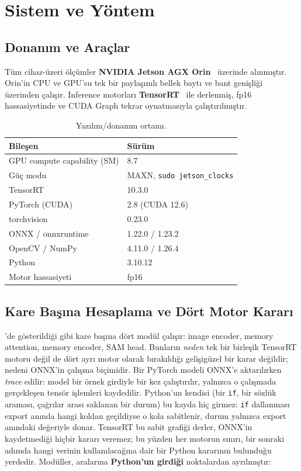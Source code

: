 \chapter{Sistem ve Yöntem}
\label{ch:sistem-yontem}

\section{Donanım ve Araçlar}

Tüm cihaz-üzeri ölçümler \textbf{NVIDIA Jetson AGX Orin}~\cite{nvidia2024orin}
üzerinde alınmıştır. Orin'in CPU ve GPU'su tek bir paylaşımlı bellek
baytı ve bant genişliği üzerinden çalışır. Inference motorları
\textbf{TensorRT}~\cite{nvidia2024tensorrt} ile derlenmiş, fp16
hassasiyetinde ve CUDA Graph tekrar oynatmasıyla çalıştırılmıştır.

\begin{table}[H]
  \centering
  \caption{Yazılım/donanım ortamı.}
  \label{tab:ortam}
  \begin{tabular}{ll}
    \toprule
    Bileşen & Sürüm \\
    \midrule
    GPU compute capability (SM) & 8.7 \\
    Güç modu & MAXN, \texttt{sudo jetson\_clocks} \\
    TensorRT & 10.3.0 \\
    PyTorch (CUDA) & 2.8 (CUDA 12.6) \\
    torchvision & 0.23.0 \\
    ONNX / onnxruntime & 1.22.0 / 1.23.2 \\
    OpenCV / NumPy & 4.11.0 / 1.26.4 \\
    Python & 3.10.12 \\
    Motor hassasiyeti & fp16 \\
    \bottomrule
  \end{tabular}
\end{table}

\section{Kare Başına Hesaplama ve Dört Motor Kararı}
\label{sec:dort-motor}

'de gösterildiği gibi kare başına dört modül
çalışır: image encoder, memory attention, memory encoder, SAM head.
Bunların \emph{neden} tek bir birleşik TensorRT motoru değil de dört
ayrı motor olarak bırakıldığı gelişigüzel bir karar değildir; nedeni
ONNX'in çalışma biçimidir. Bir PyTorch modeli ONNX'e aktarılırken
\emph{trace} edilir: model bir örnek girdiyle bir kez çalıştırılır,
yalnızca o çalışmada gerçekleşen tensör işlemleri kaydedilir. Python'un
kendisi (bir \texttt{if}, bir sözlük araması, çağrılar arası saklanan
bir durum) bu kayda hiç girmez: \texttt{if} dallanması export anında
hangi koldan geçildiyse o kola sabitlenir, durum yalnızca export
anındaki değeriyle donar. TensorRT bu sabit grafiği derler, ONNX'in
kaydetmediği hiçbir kararı veremez; bu yüzden her motorun sınırı, bir
sonraki adımda hangi verinin kullanılacağına dair bir Python kararının
bulunduğu yerdedir. Modüller, aralarına \textbf{Python'un girdiği}
noktalardan ayrılmıştır:

